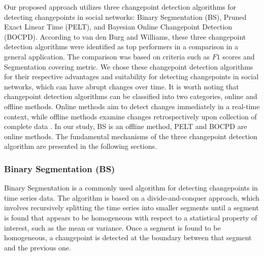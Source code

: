 \documentclass[]{interact}
\theoremstyle{plain}%
\theoremstyle{definition}
\theoremstyle{remark}
\begin{document}
{	Our proposed approach utilizes three changepoint detection algorithms for detecting changepoints in social networks: Binary Segmentation (BS), Pruned Exact Linear Time (PELT), and Bayesian Online Changepoint Detection (BOCPD). According to van den Burg and Williams\cite{burgEvaluationChangePoint2022}, these three changepoint detection algorithms were identified as top performers in a comparison in a general application. The comparison was based on criteria such as $F1$ scores and Segmentation covering metric. We chose these changepoint detection algorithms for their respective advantages and suitability for detecting changepoints in social networks, which can have abrupt changes over time. It is worth noting that changepoint detection algorithms can be classified into two categories, online and offline methods. Online methods aim to detect changes immediately in a real-time context, while offline methods examine changes retrospectively upon collection of complete data \cite{kendrickChangePointDetection2018}. In our study, BS is an offline method, PELT and BOCPD are online methods. The fundamental mechanisms of the three changepoint detection algorithm are presented in the following sections.
	
	\subsubsection{Binary Segmentation (BS)}
	
	
	\hspace{0.28cm} Binary Segmentation is a commonly used algorithm for detecting changepoints in time series data. The algorithm is based on a divide-and-conquer approach, which involves recursively splitting the time series into smaller segments until a segment is found that appears to be homogeneous with respect to a statistical property of interest, such as the mean or variance. Once a segment is found to be homogeneous, a changepoint is detected at the boundary between that segment and the previous one\cite{killickOptimalDetectionChangepoints2012}. \\
	
}
\end{document}
